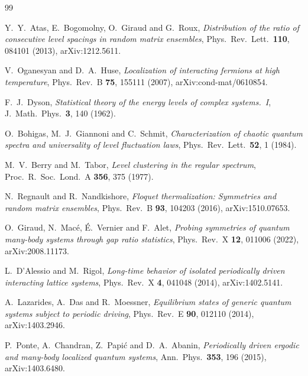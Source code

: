 \begin{thebibliography}{99}

 Y.~Y.~Atas, E.~Bogomolny, O.~Giraud and G.~Roux,
  \emph{Distribution of the ratio of consecutive level spacings in random matrix
  ensembles}, Phys.\ Rev.\ Lett.\ \textbf{110}, 084101 (2013),
  arXiv:1212.5611.

 V.~Oganesyan and D.~A.~Huse,
  \emph{Localization of interacting fermions at high temperature},
  Phys.\ Rev.\ B \textbf{75}, 155111 (2007), arXiv:cond-mat/0610854.

 F.~J.~Dyson,
  \emph{Statistical theory of the energy levels of complex systems.~I},
  J.\ Math.\ Phys.\ \textbf{3}, 140 (1962).

 O.~Bohigas, M.~J.~Giannoni and C.~Schmit,
  \emph{Characterization of chaotic quantum spectra and universality of level
  fluctuation laws}, Phys.\ Rev.\ Lett.\ \textbf{52}, 1 (1984).

 M.~V.~Berry and M.~Tabor,
  \emph{Level clustering in the regular spectrum},
  Proc.\ R.\ Soc.\ Lond.\ A \textbf{356}, 375 (1977).

 N.~Regnault and R.~Nandkishore,
  \emph{Floquet thermalization: Symmetries and random matrix ensembles},
  Phys.\ Rev.\ B \textbf{93}, 104203 (2016), arXiv:1510.07653.

 O.~Giraud, N.~Mac\'e, \'E.~Vernier and F.~Alet,
  \emph{Probing symmetries of quantum many-body systems through gap ratio
  statistics}, Phys.\ Rev.\ X \textbf{12}, 011006 (2022), arXiv:2008.11173.

 L.~D'Alessio and M.~Rigol,
  \emph{Long-time behavior of isolated periodically driven interacting lattice
  systems}, Phys.\ Rev.\ X \textbf{4}, 041048 (2014), arXiv:1402.5141.

 A.~Lazarides, A.~Das and R.~Moessner,
  \emph{Equilibrium states of generic quantum systems subject to periodic
  driving}, Phys.\ Rev.\ E \textbf{90}, 012110 (2014), arXiv:1403.2946.

 P.~Ponte, A.~Chandran, Z.~Papi\'c and D.~A.~Abanin,
  \emph{Periodically driven ergodic and many-body localized quantum systems},
  Ann.\ Phys.\ \textbf{353}, 196 (2015), arXiv:1403.6480.


\end{thebibliography}
